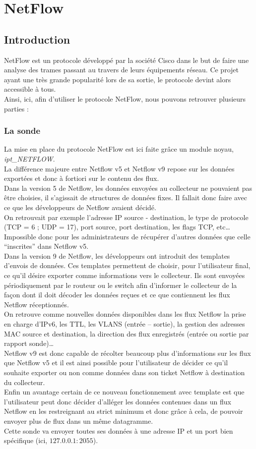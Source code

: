 \section{NetFlow}
\subsection{Introduction}
NetFlow est un protocole développé par la société Cisco dans le but de faire une analyse des trames passant au travers de leurs équipements réseau. Ce projet ayant une très grande popularité lors de sa sortie, le protocole devint alors accessible à tous.\\
Ainsi, ici, afin d'utiliser le protocole NetFlow, nous pouvons retrouver plusieurs parties :
\subsubsection{La sonde}
La mise en place du protocole NetFlow est ici faite grâce un module noyau, \textit{ipt\_NETFLOW}.\\
La différence majeure entre Netflow v5 et Netflow v9 repose sur les données exportées et donc à fortiori sur le contenu des flux.\\
Dans la version 5 de Netflow, les données envoyées au collecteur ne pouvaient pas être choisies, il s’agissait de structures de données fixes. Il fallait donc faire avec ce que les développeurs de Netflow avaient décidé.\\
On retrouvait par exemple l’adresse IP source - destination, le type de protocole (TCP = 6 ; UDP = 17), port source, port destination, les flags TCP, etc\ldots\\
Impossible donc pour les administrateurs de récupérer d’autres données que celle \enquote{inscrites} dans Netflow v5.\\
Dans la version 9 de Netflow, les développeurs ont introduit des templates d’envois de données. Ces templates permettent de choisir, pour l’utilisateur final, ce qu’il désire exporter comme informations vers le collecteur. Ils sont envoyées périodiquement par le routeur ou le switch afin d’informer le collecteur de la façon dont il doit décoder les données reçues et ce que contiennent les flux Netflow réceptionnés.\\
On retrouve comme nouvelles données disponibles dans les flux Netflow la prise en charge d’IPv6, les TTL, les VLANS (entrée – sortie), la gestion des adresses MAC source et destination, la direction des flux enregistrés (entrée ou sortie par rapport sonde)\ldots\\
Netflow v9 est donc capable de récolter beaucoup plus d’informations sur les flux que Netflow v5 et il est ainsi possible pour l’utilisateur de décider ce qu’il souhaite exporter ou non comme données dans son ticket Netflow à destination du collecteur.\\
Enfin un avantage certain de ce nouveau fonctionnement avec template est que l’utilisateur peut donc décider d’alléger les données contenues dans un flux Netflow en les restreignant au strict minimum et donc grâce à cela, de pouvoir envoyer plus de flux dans un même datagramme.\\
Cette sonde va envoyer toutes ses données à une adresse IP et un port bien spécifique (ici, $127.0.0.1:2055$).
